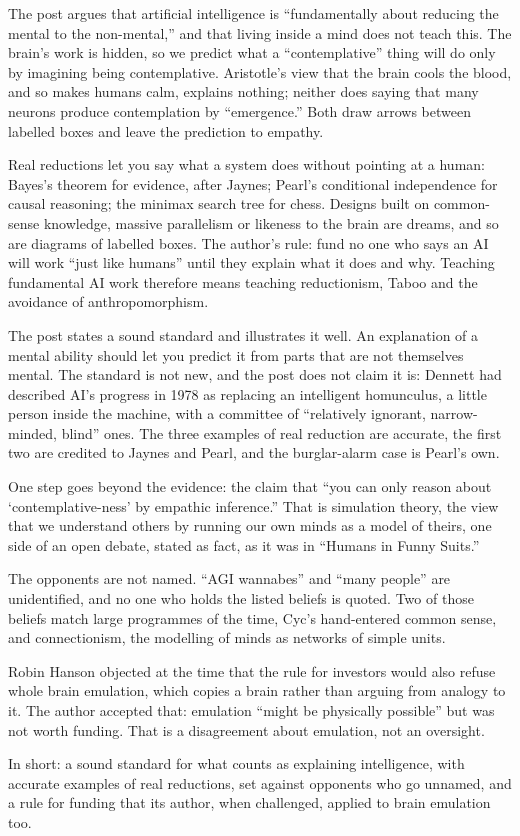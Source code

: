 \begin{afterword}
\summaryhead

The post argues that artificial intelligence is ``fundamentally about reducing the mental to the non-mental,'' and that living inside a mind does not teach this. The brain's work is hidden, so we predict what a ``contemplative'' thing will do only by imagining being contemplative. Aristotle's view that the brain cools the blood, and so makes humans calm, explains nothing; neither does saying that many neurons produce contemplation by ``emergence.'' Both draw arrows between labelled boxes and leave the prediction to empathy.

Real reductions let you say what a system does without pointing at a human: Bayes's theorem for evidence, after Jaynes; Pearl's conditional independence for causal reasoning; the minimax search tree for chess. Designs built on common-sense knowledge, massive parallelism or likeness to the brain are dreams, and so are diagrams of labelled boxes. The author's rule: fund no one who says an AI will work ``just like humans'' until they explain what it does and why. Teaching fundamental AI work therefore means teaching reductionism, Taboo and the avoidance of anthropomorphism.

\responsehead

The post states a sound standard and illustrates it well. An explanation of a mental ability should let you predict it from parts that are not themselves mental. The standard is not new, and the post does not claim it is: Dennett had described AI's progress in 1978 as replacing an intelligent homunculus, a little person inside the machine, with a committee of ``relatively ignorant, narrow-minded, blind'' ones. The three examples of real reduction are accurate, the first two are credited to Jaynes and Pearl, and the burglar-alarm case is Pearl's own.

One step goes beyond the evidence: the claim that ``you can only reason about `contemplative-ness' by empathic inference.'' That is simulation theory, the view that we understand others by running our own minds as a model of theirs, one side of an open debate, stated as fact, as it was in ``Humans in Funny Suits.''

The opponents are not named. ``AGI wannabes'' and ``many people'' are unidentified, and no one who holds the listed beliefs is quoted. Two of those beliefs match large programmes of the time, Cyc's hand-entered common sense, and connectionism, the modelling of minds as networks of simple units.

Robin Hanson objected at the time that the rule for investors would also refuse whole brain emulation, which copies a brain rather than arguing from analogy to it. The author accepted that: emulation ``might be physically possible'' but was not worth funding. That is a disagreement about emulation, not an oversight.

In short: a sound standard for what counts as explaining intelligence, with accurate examples of real reductions, set against opponents who go unnamed, and a rule for funding that its author, when challenged, applied to brain emulation too.
\end{afterword}
